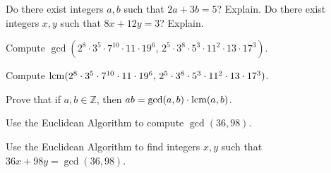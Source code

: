 \documentclass[11pt,letterpaper]{article}
\begin{document}
\homework{}

 Do there exist integers $a, b$ such that $2a + 3b= 5$? Explain. Do there exist integers $x, y$ such that $8x + 12y= 3$? Explain. \pspace





\newpage





 Compute $\gcd(2^8 \cdot 3^5 \cdot 7^{10} \cdot 11 \cdot 19^6, \, 2^5 \cdot 3^8 \cdot 5^3 \cdot 11^2 \cdot 13 \cdot 17^3)$. \pspace





\newpage





 Compute $\operatorname{lcm}(2^8 \cdot 3^5 \cdot 7^{10} \cdot 11 \cdot 19^6, \, 2^5 \cdot 3^8 \cdot 5^3 \cdot 11^2 \cdot 13 \cdot 17^3)$. \pspace





\newpage





 Prove that if $a, b \in \mathbb{Z}$, then $ab= \gcd(a, b) \cdot \operatorname{lcm}(a, b)$. \pspace





\newpage





 Use the Euclidean Algorithm to compute $\gcd(36, 98)$. \pspace





\newpage





 Use the Euclidean Algorithm to find integers $x, y$ such that $36x + 98y= \gcd(36, 98)$. \pspace
\end{document}
